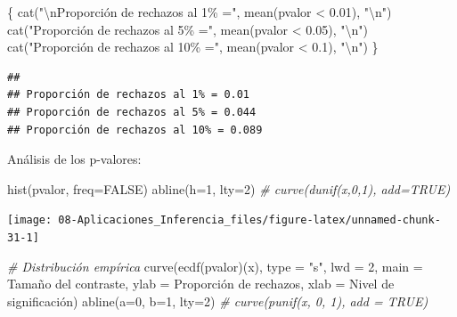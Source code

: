 \documentclass[
]{book}
\newenvironment{Shaded}{\begin{snugshade}}{\end{snugshade}}
\newcommand{\AttributeTok}[1]{\textcolor[rgb]{0.77,0.63,0.00}{#1}}
\newcommand{\CommentTok}[1]{\textcolor[rgb]{0.56,0.35,0.01}{\textit{#1}}}
\newcommand{\ConstantTok}[1]{\textcolor[rgb]{0.00,0.00,0.00}{#1}}
\newcommand{\DecValTok}[1]{\textcolor[rgb]{0.00,0.00,0.81}{#1}}
\newcommand{\FloatTok}[1]{\textcolor[rgb]{0.00,0.00,0.81}{#1}}
\newcommand{\FunctionTok}[1]{\textcolor[rgb]{0.00,0.00,0.00}{#1}}
\newcommand{\NormalTok}[1]{#1}
\newcommand{\SpecialCharTok}[1]{\textcolor[rgb]{0.00,0.00,0.00}{#1}}
\newcommand{\StringTok}[1]{\textcolor[rgb]{0.31,0.60,0.02}{#1}}
\theoremstyle{break}
\theoremstyle{definition}
\theoremstyle{definition}
\theoremstyle{definition}
\theoremstyle{definition}
\theoremstyle{remark}
\begin{document}
\begin{enumerate}
\begin{Shaded}
\begin{Highlighting}[]
\NormalTok{\{}
  \FunctionTok{cat}\NormalTok{(}\StringTok{"}\SpecialCharTok{\textbackslash{}n}\StringTok{Proporción de rechazos al 1\% ="}\NormalTok{, }\FunctionTok{mean}\NormalTok{(pvalor }\SpecialCharTok{\textless{}} \FloatTok{0.01}\NormalTok{), }\StringTok{"}\SpecialCharTok{\textbackslash{}n}\StringTok{"}\NormalTok{)}
  \FunctionTok{cat}\NormalTok{(}\StringTok{"Proporción de rechazos al 5\% ="}\NormalTok{, }\FunctionTok{mean}\NormalTok{(pvalor }\SpecialCharTok{\textless{}} \FloatTok{0.05}\NormalTok{), }\StringTok{"}\SpecialCharTok{\textbackslash{}n}\StringTok{"}\NormalTok{)}
  \FunctionTok{cat}\NormalTok{(}\StringTok{"Proporción de rechazos al 10\% ="}\NormalTok{, }\FunctionTok{mean}\NormalTok{(pvalor }\SpecialCharTok{\textless{}} \FloatTok{0.1}\NormalTok{), }\StringTok{"}\SpecialCharTok{\textbackslash{}n}\StringTok{"}\NormalTok{)}
\NormalTok{\}}
\end{Highlighting}
\end{Shaded}

\begin{verbatim}
## 
## Proporción de rechazos al 1% = 0.01 
## Proporción de rechazos al 5% = 0.044 
## Proporción de rechazos al 10% = 0.089
\end{verbatim}

  Análisis de los p-valores:

\begin{Shaded}
\begin{Highlighting}[]
\FunctionTok{hist}\NormalTok{(pvalor, }\AttributeTok{freq=}\ConstantTok{FALSE}\NormalTok{)}
\FunctionTok{abline}\NormalTok{(}\AttributeTok{h=}\DecValTok{1}\NormalTok{, }\AttributeTok{lty=}\DecValTok{2}\NormalTok{)   }\CommentTok{\# curve(dunif(x,0,1), add=TRUE)}
\end{Highlighting}
\end{Shaded}

  \begin{center}\texttt{[image: 08-Aplicaciones\_Inferencia\_files/figure-latex/unnamed-chunk-31-1]} \end{center}

\begin{Shaded}
\begin{Highlighting}[]
\CommentTok{\# Distribución empírica}
\FunctionTok{curve}\NormalTok{(}\FunctionTok{ecdf}\NormalTok{(pvalor)(x), }\AttributeTok{type =} \StringTok{"s"}\NormalTok{, }\AttributeTok{lwd =} \DecValTok{2}\NormalTok{, }\AttributeTok{main =} \StringTok{\textquotesingle{}Tamaño del contraste\textquotesingle{}}\NormalTok{, }
      \AttributeTok{ylab =} \StringTok{\textquotesingle{}Proporción de rechazos\textquotesingle{}}\NormalTok{, }\AttributeTok{xlab =} \StringTok{\textquotesingle{}Nivel de significación\textquotesingle{}}\NormalTok{)}
\FunctionTok{abline}\NormalTok{(}\AttributeTok{a=}\DecValTok{0}\NormalTok{, }\AttributeTok{b=}\DecValTok{1}\NormalTok{, }\AttributeTok{lty=}\DecValTok{2}\NormalTok{)   }\CommentTok{\# curve(punif(x, 0, 1), add = TRUE)}
\end{Highlighting}
\end{Shaded}


\end{enumerate}
\end{document}
